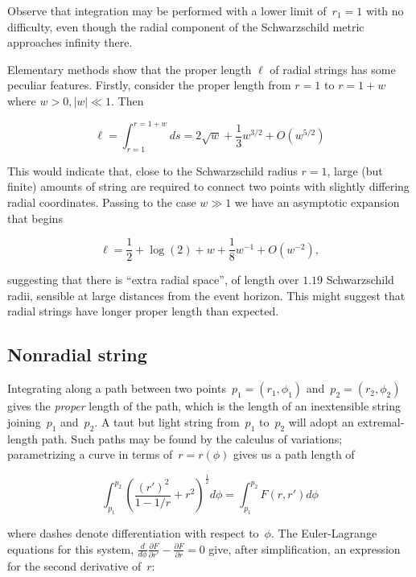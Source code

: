 \documentclass[prb,preprint]{revtex4-1}
\begin{document}
Observe that integration may be performed with a lower limit
of~$r_1=1$ with no difficulty, even though the radial component of the
Schwarzschild metric approaches infinity there.

Elementary methods show that the proper length $\ell$ of radial strings has
some peculiar features.  Firstly, consider the proper length from
$r=1$ to $r=1+w$ where $w>0, \left|w\right|\ll 1$.  Then

\begin{equation}
  \ell=\int_{r=1}^{r=1+w}ds
  =2\sqrt{w} + \frac{1}{3}w^{3/2} + O(w^{5/2})
\end{equation}

This would indicate that, close to the Schwarzschild radius $r=1$,
large (but finite) amounts of string are required to connect two
points with slightly differing radial coordinates.  Passing to the
case $w\gg 1$ we have an asymptotic expansion that begins

\begin{equation}
  \ell  =\frac{1}{2} + \log(2) + w + \frac{1}{8}w^{-1} + O(w^{-2}),
\end{equation}

\noindent suggesting that there is ``extra radial space'', of length
over $1.19$ Schwarzschild radii, sensible at large distances from the
event horizon.  This might suggest that radial strings have longer
proper length than expected.

\subsection{Nonradial string}
Integrating along a path between two
points~$p_1=\left(r_1,\phi_1\right)$ and~$p_2=\left(r_2,\phi_2\right)$
gives the {\em proper} length of the path, which is the length of an
inextensible string joining~$p_1$ and~$p_2$.  A taut but light string
from~$p_1$ to~$p_2$ will adopt an extremal-length path.  Such paths
may be found by the calculus of variations; parametrizing a curve in
terms of~$r=r\left(\phi\right)$ gives us a path length of

\begin{equation}
  \int_{p_1}^{p_2}\left(\frac{\left(r'\right)^2}{1-1/r} + r^2\right)^\frac{1}{2}d\phi=
  \int_{p_1}^{p_2}F\left(r,r'\right)d\phi
\end{equation}

\noindent where dashes denote differentiation with respect to~$\phi$.  The
Euler-Lagrange equations for this system,
$\frac{d}{d\phi}\frac{\partial F}{\partial r'}-\frac{\partial
  F}{\partial r}=0$ give, after simplification, an expression for the
second derivative of~$r$:
\end{document}
